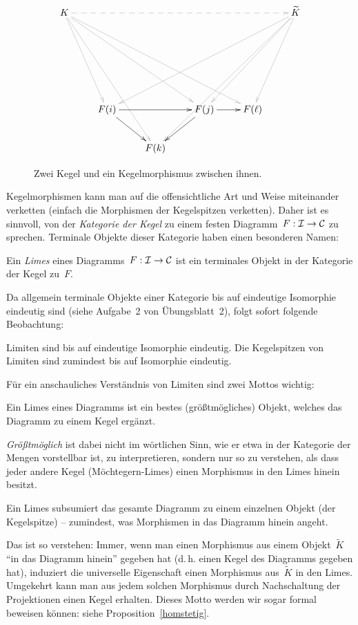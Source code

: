 \begin{figure}
  \[
    \xymatrix{
      K \ar@[grey]@{-->}[rrrrr]
      \ar@[grey][dddr] \ar@[grey][dddrrr] \ar@[grey][dddrrrr] \ar@[grey][ddddrr] &&&&&
      \widetilde K \ar@[grey][dddl] \ar@[grey][dddll] \ar@[grey][dddllll]
      \ar@[grey][ddddlll]
      \\\\\\
      & F(i) \ar[rr] \ar[rd] && F(j) \ar[r] \ar[ld] & F(\ell) \\
      & & F(k)
    }
  \]
  \caption{\label{kegel}Zwei Kegel und ein Kegelmorphismus zwischen ihnen.}
\end{figure}

Kegelmorphismen kann man auf die offensichtliche Art und Weise miteinander
verketten (einfach die Morphismen der Kegelspitzen verketten). Daher ist es
sinnvoll, von der \emph{Kategorie der Kegel} zu einem festen
Diagramm~$F:\mathcal{I}\to\mathcal{C}$ zu sprechen. Terminale Objekte dieser Kategorie haben
einen besonderen Namen:
\begin{defn}Ein \emph{Limes} eines Diagramms~$F:\mathcal{I}\to\mathcal{C}$ ist ein terminales
Objekt in der Kategorie der Kegel zu~$F$.\end{defn}
Da allgemein terminale Objekte einer Kategorie bis auf eindeutige Isomorphie
eindeutig sind (siehe Aufgabe~2 von Übungsblatt~2), folgt sofort folgende
Beobachtung:
\begin{prop}Limiten sind bis auf eindeutige Isomorphie eindeutig. Die
Kegelspitzen von Limiten sind zumindest bis auf Isomorphie eindeutig.\end{prop}

Für ein anschauliches Verständnis von Limiten sind zwei Mottos wichtig:
\begin{motto}Ein Limes eines Diagramms ist ein bestes
(größtmögliches) Objekt, welches das Diagramm zu einem Kegel ergänzt.
\end{motto}
\emph{Größtmöglich} ist dabei nicht im wörtlichen Sinn, wie er etwa in der Kategorie
der Mengen vorstellbar ist, zu interpretieren, sondern nur so zu verstehen,
als dass jeder andere Kegel
(Möchtegern-Limes) einen Morphismus in den Limes hinein besitzt.

\begin{motto}\label{limessubsumiert}
Ein Limes subsumiert das gesamte Diagramm zu einem einzelnen Objekt (der
Kegelspitze) -- zumindest, was Morphismen in das Diagramm hinein
angeht.\end{motto}
Das ist so verstehen: Immer, wenn man einen Morphismus aus einem
Objekt~$\widetilde K$ "`in das Diagramm hinein"' gegeben hat (d.\,h. einen Kegel des Diagramms
gegeben hat), induziert die universelle Eigenschaft einen Morphismus
aus~$\widetilde K$ in den Limes.  Umgekehrt kann man aus jedem solchen
Morphismus durch Nachschaltung der Projektionen einen Kegel erhalten.
Dieses Motto werden wir sogar formal beweisen können: siehe
Proposition~\ref{homstetig}.


